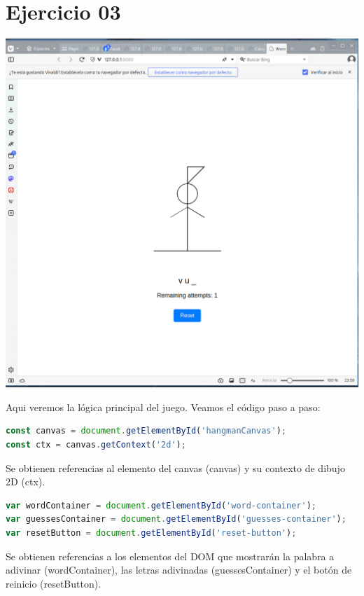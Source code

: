\section{Ejercicio 03}

\includegraphics[width=1\textwidth]{./img/ejercicio03.png}

Aqui veremos la lógica principal del juego. Veamos el código paso a paso:

\begin{lstlisting}[language=JavaScript]
const canvas = document.getElementById('hangmanCanvas');
const ctx = canvas.getContext('2d');
\end{lstlisting}

Se obtienen referencias al elemento del canvas (canvas) y su contexto de dibujo 2D (ctx).

\begin{lstlisting}[language=JavaScript]
var wordContainer = document.getElementById('word-container');
var guessesContainer = document.getElementById('guesses-container');
var resetButton = document.getElementById('reset-button');
\end{lstlisting}

Se obtienen referencias a los elementos del DOM que mostrarán la palabra a adivinar (wordContainer), las letras adivinadas (guessesContainer) y el botón de reinicio (resetButton).

